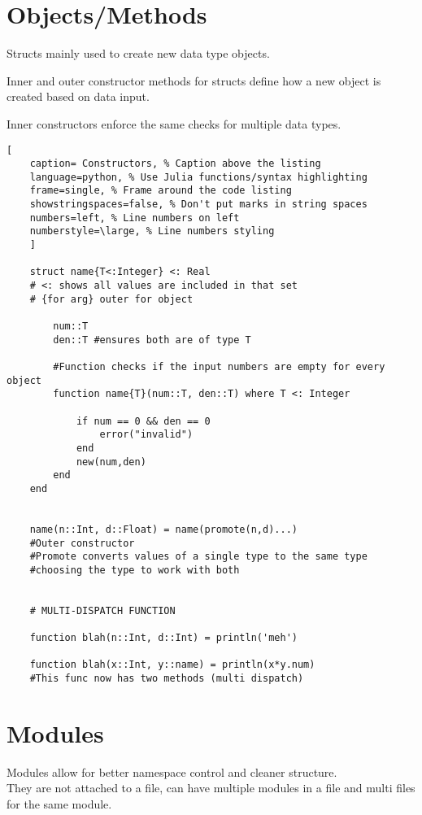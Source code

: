 \documentclass[11pt]{scrartcl} %
\begin{document}
\section{Objects/Methods}

Structs mainly used to create new data type objects.

Inner and outer constructor methods for structs define how a new object is created based on data input.

Inner constructors enforce the same checks for multiple data types.

\begin{lstlisting}[
	caption= Constructors, % Caption above the listing
	language=python, % Use Julia functions/syntax highlighting
	frame=single, % Frame around the code listing
	showstringspaces=false, % Don't put marks in string spaces
	numbers=left, % Line numbers on left
	numberstyle=\large, % Line numbers styling
	]

	struct name{T<:Integer} <: Real 
	# <: shows all values are included in that set
	# {for arg} outer for object

		num::T
		den::T #ensures both are of type T

		#Function checks if the input numbers are empty for every object
		function name{T}(num::T, den::T) where T <: Integer

			if num == 0 && den == 0
				error("invalid")
			end
			new(num,den)
		end		
	end 
	

	name(n::Int, d::Float) = name(promote(n,d)...)
	#Outer constructor
	#Promote converts values of a single type to the same type 
	#choosing the type to work with both


	# MULTI-DISPATCH FUNCTION

	function blah(n::Int, d::Int) = println('meh')

	function blah(x::Int, y::name) = println(x*y.num)
	#This func now has two methods (multi dispatch)

\end{lstlisting}

\section{Modules}

Modules allow for better namespace control and cleaner structure.\\

They are not attached to a file, can have multiple modules in a file and multi files for the same module.\\
\end{document}
